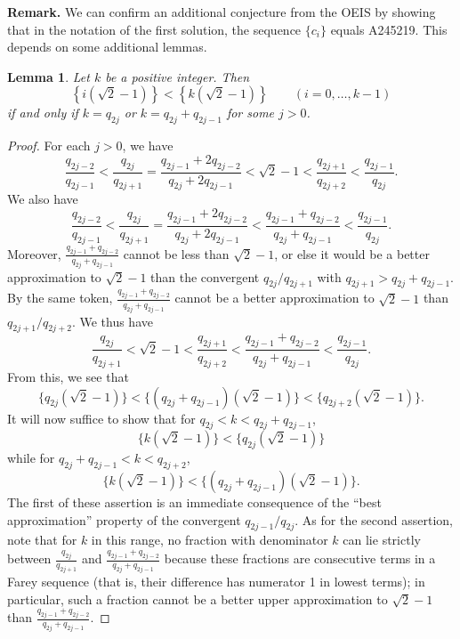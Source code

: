\documentclass[amssymb,twocolumn,pra,10pt,aps]{revtex4-1}
\newtheorem{lemma}{Lemma}
\begin{document}
\begin{itemize}
\noindent
\textbf{Remark.}
We can confirm an additional conjecture from the OEIS by showing that in the notation of the first solution,
the sequence $\{c_i\}$ equals
A245219. This depends on some additional lemmas.
\begin{lemma}
Let $k$ be a positive integer. Then
\[
\left\{ i(\sqrt{2}-1) \right\} < \left\{ k(\sqrt{2}-1) \right\} \qquad (i=0,\dots,k-1)
\]
if and only if $k = q_{2j}$ or $k = q_{2j}+q_{2j-1}$ for some $j>0$.
\end{lemma}
\begin{proof}
For each $j>0$, we have
\[
\frac{q_{2j-2}}{q_{2j-1}} < \frac{q_{2j}}{q_{2j+1}} = \frac{q_{2j-1} + 2q_{2j-2}}{q_{2j} + 2q_{2j-1}} < \sqrt{2}-1 < \frac{q_{2j+1}}{q_{2j+2}} < \frac{q_{2j-1}}{q_{2j}}.
\]
We also have
\[
\frac{q_{2j-2}}{q_{2j-1}} < \frac{q_{2j}}{q_{2j+1}} = \frac{q_{2j-1} + 2q_{2j-2}}{q_{2j} + 2q_{2j-1}} < \frac{q_{2j-1} + q_{2j-2}}{q_{2j} + q_{2j-1}}  < \frac{q_{2j-1}}{q_{2j}}.
\]
Moreover, $\frac{q_{2j-1}+q_{2j-2}}{q_{2j}+q_{2j-1}}$ cannot be  less than $\sqrt{2}-1$, or else it would be a better approximation to $\sqrt{2}-1$
than the convergent $q_{2j}/q_{2j+1}$ with $q_{2j+1} > q_{2j}+q_{2j-1}$. By the same token, $\frac{q_{2j-1}+q_{2j-2}}{q_{2j}+q_{2j-1}}$ cannot be a  better approximation to
$\sqrt{2}-1$ than $q_{2j+1}/q_{2j+2}$. We thus have
\[
\frac{q_{2j}}{q_{2j+1}} < \sqrt{2}-1 < \frac{q_{2j+1}}{q_{2j+2}} < \frac{q_{2j-1} + q_{2j-2}}{q_{2j} + q_{2j-1}} < \frac{q_{2j-1}}{q_{2j}}.
\]
From this, we see that
\[
\{q_{2j}(\sqrt{2}-1)\} < \{(q_{2j}+q_{2j-1})(\sqrt{2}-1)\} < \{q_{2j+2}(\sqrt{2}-1)\}.
\]
It will now suffice to show that for $q_{2j} < k < q_{2j}+q_{2j-1}$,
\[
\{k(\sqrt{2}-1)\} < \{q_{2j}(\sqrt{2}-1)\}
\]
while for $q_{2j}+q_{2j-1} < k < q_{2j+2}$,
\[
\{k(\sqrt{2}-1)\} < \{(q_{2j}+q_{2j-1})(\sqrt{2}-1)\}.
\]
The first of these assertion is an immediate consequence of the ``best approximation'' property of the convergent $q_{2j-1}/q_{2j}$.
As for the second assertion, note that for $k$ in this range, no fraction with denominator $k$ can lie strictly between
$\frac{q_{2j}}{q_{2j+1}}$ and $\frac{q_{2j-1} + q_{2j-2}}{q_{2j} + q_{2j-1}}$ because these fractions are consecutive terms in a Farey sequence
(that is, their difference has numerator 1 in lowest terms);
in particular, such a fraction cannot be a better upper approximation to $\sqrt{2}-1$ than $\frac{q_{2j-1} + q_{2j-2}}{q_{2j} + q_{2j-1}}$.
\end{proof}


\end{itemize}
\end{document}
